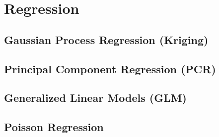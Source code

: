 \section{Regression}
\label{additional:Regression}

\subsection{Gaussian Process Regression (Kriging)}
\label{additional:Regression:kriging}

\subsection{Principal Component Regression (PCR)}
\label{additional:Regression:PCR}

\subsection{Generalized Linear Models (GLM)}
\label{additional:Regression:GLM}

\subsection{Poisson Regression}
\label{additional:Regression:poisson}

